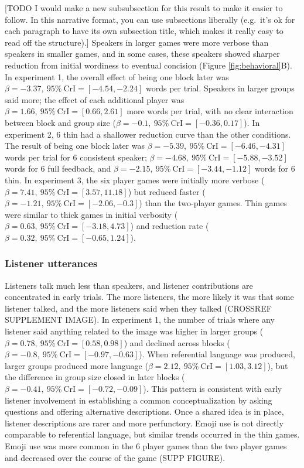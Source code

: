 \documentclass[
  english,
  a4paper,
]{article}
\begin{document}
{[}TODO I would make a new subsubsection for this result to make it easier to follow. In this narrative format, you can use subsections liberally (e.g.~it's ok for each paragraph to have its own subsection title, which makes it really easy to read off the structure).{]}
Speakers in larger games were more verbose than speakers in smaller games, and in some cases, these speakers showed sharper reduction from initial wordiness to eventual concision (Figure \ref{fig:behavioral}B). In experiment 1, the overall effect of being one block later was \(\beta=-3.37,\:95\%\:\mathrm{CrI}=[-4.54, -2.24]\) words per trial. Speakers in larger groups said more; the effect of each additional player was \(\beta=1.66,\:95\%\:\mathrm{CrI}=[0.66, 2.61]\) more words per trial, with no clear interaction between block and group size (\(\beta=-0.1,\:95\%\:\mathrm{CrI}=[-0.36, 0.17]\)). In experiment 2, 6 thin had a shallower reduction curve than the other conditions. The result of being one block later was \(\beta=-5.39,\:95\%\:\mathrm{CrI}=[-6.46, -4.31]\) words per trial for 6 consistent speaker; \(\beta=-4.68,\:95\%\:\mathrm{CrI}=[-5.88, -3.52]\) words for 6 full feedback, and \(\beta=-2.15,\:95\%\:\mathrm{CrI}=[-3.44, -1.12]\) words for 6 thin. In experiment 3, the six player games were initially more verbose (\(\beta=7.41,\:95\%\:\mathrm{CrI}=[3.57, 11.18]\)) but reduced faster (\(\beta=-1.21,\:95\%\:\mathrm{CrI}=[-2.06, -0.3]\)) than the two-player games. Thin games were similar to thick games in initial verbosity (\(\beta=0.63,\:95\%\:\mathrm{CrI}=[-3.18, 4.73]\)) and reduction rate (\(\beta=0.32,\:95\%\:\mathrm{CrI}=[-0.65, 1.24]\)).

\hypertarget{listener-utterances}{%
\subsubsection{Listener utterances}\label{listener-utterances}}

Listeners talk much less than speakers, and listener contributions are concentrated in early trials. The more listeners, the more likely it was that some listener talked, and the more listeners said when they talked (CROSSREF SUPPLEMENT IMAGE). In experiment 1, the number of trials where any listener said anything related to the image was higher in larger groups (\(\beta=0.78,\:95\%\:\mathrm{CrI}=[0.58, 0.98]\)) and declined across blocks (\(\beta=-0.8,\:95\%\:\mathrm{CrI}=[-0.97, -0.63]\)). When referential language was produced, larger groups produced more language (\(\beta=2.12,\:95\%\:\mathrm{CrI}=[1.03, 3.12]\)), but the difference in group size closed in later blocks (\(\beta=-0.41,\:95\%\:\mathrm{CrI}=[-0.72, -0.09]\)). This pattern is consistent with early listener involvement in establishing a common conceptualization by asking questions and offering alternative descriptions. Once a shared idea is in place, listener descriptions are rarer and more perfunctory. Emoji use is not directly comparable to referential language, but similar trends occurred in the thin games. Emoji use was more common in the 6 player games than the two player games and decreased over the course of the game (SUPP FIGURE).
\end{document}
